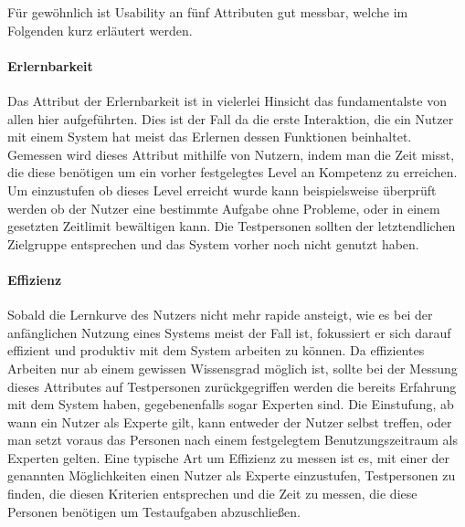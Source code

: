 Für gewöhnlich ist Usability an fünf Attributen gut messbar, welche im Folgenden kurz erläutert werden.

\paragraph{Erlernbarkeit}
Das Attribut der Erlernbarkeit ist in vielerlei Hinsicht das fundamentalste von allen hier aufgeführten.
Dies ist der Fall da die erste Interaktion, die ein Nutzer mit einem System hat meist das Erlernen dessen Funktionen beinhaltet.
Gemessen wird dieses Attribut mithilfe von Nutzern, indem man die Zeit misst, die diese benötigen um ein vorher festgelegtes Level an Kompetenz zu erreichen.
Um einzustufen ob dieses Level erreicht wurde kann beispielsweise überprüft werden ob der Nutzer eine bestimmte Aufgabe ohne Probleme, oder in einem gesetzten Zeitlimit bewältigen kann.
Die Testpersonen sollten der letztendlichen Zielgruppe entsprechen und das System vorher noch nicht genutzt haben\cite{Nielsen.1995?}.

\paragraph{Effizienz}
Sobald die Lernkurve des Nutzers nicht mehr rapide ansteigt, wie es bei der anfänglichen Nutzung eines Systems meist der Fall ist, fokussiert er sich darauf effizient  und produktiv mit dem System arbeiten zu können.
Da effizientes Arbeiten nur ab einem gewissen Wissensgrad möglich ist, sollte bei der Messung dieses Attributes auf Testpersonen zurückgegriffen werden die bereits Erfahrung mit dem System haben, gegebenenfalls sogar Experten sind.
Die Einstufung, ab wann ein Nutzer als Experte gilt, kann entweder der Nutzer selbst treffen, oder man setzt voraus das Personen nach einem festgelegtem Benutzungszeitraum als Experten gelten.
Eine typische Art um Effizienz zu messen ist es, mit einer der genannten Möglichkeiten einen Nutzer als Experte einzustufen, Testpersonen zu finden, die diesen Kriterien entsprechen und die Zeit zu messen, die diese Personen benötigen um Testaufgaben abzuschließen\cite{Nielsen.1995?}.

